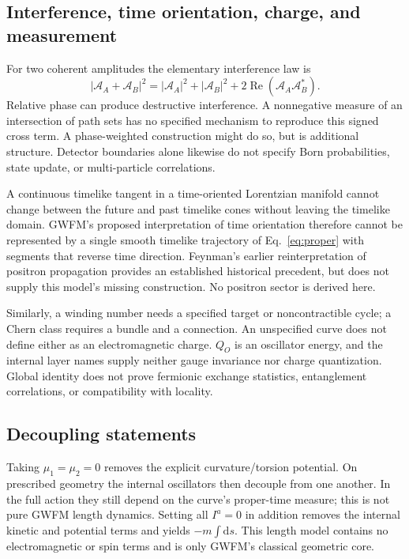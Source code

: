 \documentclass[aip,jmp,reprint,onecolumn,amsmath,amssymb]{revtex4-2}
\newcommand{\dd}{\mathrm{d}}
\begin{document}
\subsection{Interference, time orientation, charge, and measurement}
For two coherent amplitudes the elementary interference law is
\begin{equation}
 |\mathcal A_A+\mathcal A_B|^2
 =|\mathcal A_A|^2+|\mathcal A_B|^2
 +2\operatorname{Re}(\mathcal A_A\mathcal A_B^*).
\end{equation}
Relative phase can produce destructive interference. A nonnegative measure of an intersection of path sets has no specified mechanism to reproduce this signed cross term. A phase-weighted construction might do so, but is additional structure. Detector boundaries alone likewise do not specify Born probabilities, state update, or multi-particle correlations.

A continuous timelike tangent in a time-oriented Lorentzian manifold cannot change between the future and past timelike cones without leaving the timelike domain. GWFM's proposed interpretation of time orientation therefore cannot be represented by a single smooth timelike trajectory of Eq.~\eqref{eq:proper} with segments that reverse time direction. Feynman's earlier reinterpretation of positron propagation provides an established historical precedent,\cite{feynman} but does not supply this model's missing construction. No positron sector is derived here.

Similarly, a winding number needs a specified target or noncontractible cycle; a Chern class requires a bundle and a connection. An unspecified curve does not define either as an electromagnetic charge. $Q_O$ is an oscillator energy, and the internal layer names supply neither gauge invariance nor charge quantization. Global identity does not prove fermionic exchange statistics, entanglement correlations, or compatibility with locality.

\subsection{Decoupling statements}
Taking $\mu_1=\mu_2=0$ removes the explicit curvature/torsion potential. On prescribed geometry the internal oscillators then decouple from one another. In the full action they still depend on the curve's proper-time measure; this is not pure GWFM length dynamics. Setting all $I^a=0$ in addition removes the internal kinetic and potential terms and yields $-m\int\dd s$. This length model contains no electromagnetic or spin terms and is only GWFM's classical geometric core.
\end{document}
